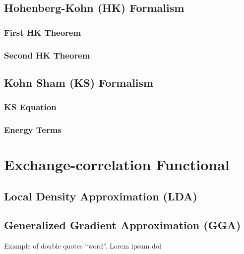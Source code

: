     \subsection{Hohenberg-Kohn (HK) Formalism}
    \subsubsection{First HK Theorem}
        \subsubsection{Second HK Theorem}
    \subsection{Kohn Sham (KS) Formalism}
        \subsubsection{KS Equation}
        \subsubsection{Energy Terms}
\section{Exchange-correlation Functional}
    \subsection{Local Density Approximation (LDA)}
    \subsection{Generalized Gradient Approximation (GGA)}

Example of double quotes ``word''. Lorem ipsum dol